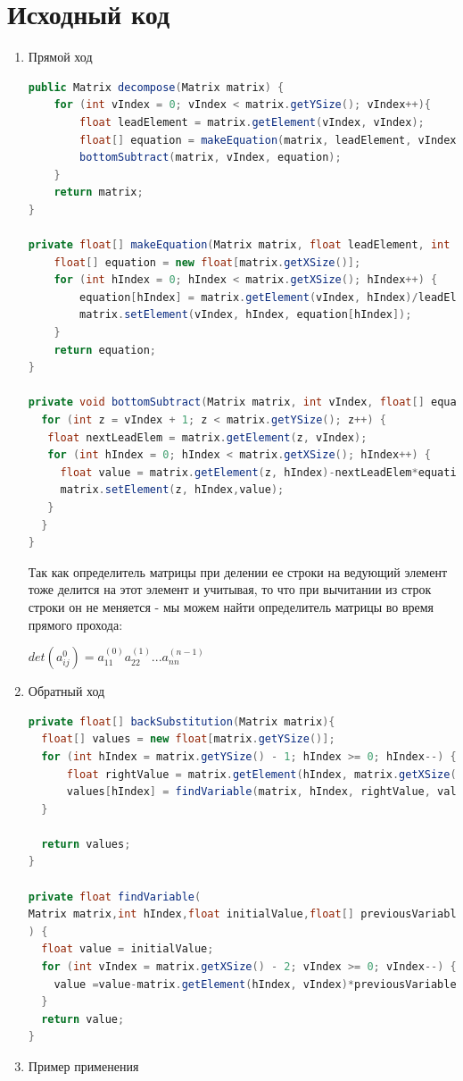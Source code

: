 \documentclass[12pt,letterpaper]{article}
\begin{document}
\section*{Исходный код}
\begin{enumerate}
\item Прямой ход
\begin{lstlisting}[language=java]
public Matrix decompose(Matrix matrix) {
    for (int vIndex = 0; vIndex < matrix.getYSize(); vIndex++){
        float leadElement = matrix.getElement(vIndex, vIndex);
        float[] equation = makeEquation(matrix, leadElement, vIndex);
        bottomSubtract(matrix, vIndex, equation);
    }
    return matrix;
}

private float[] makeEquation(Matrix matrix, float leadElement, int vIndex){
    float[] equation = new float[matrix.getXSize()];
    for (int hIndex = 0; hIndex < matrix.getXSize(); hIndex++) {
        equation[hIndex] = matrix.getElement(vIndex, hIndex)/leadElement;
        matrix.setElement(vIndex, hIndex, equation[hIndex]);
    }
    return equation;
}

private void bottomSubtract(Matrix matrix, int vIndex, float[] equation){
  for (int z = vIndex + 1; z < matrix.getYSize(); z++) {
   float nextLeadElem = matrix.getElement(z, vIndex);
   for (int hIndex = 0; hIndex < matrix.getXSize(); hIndex++) {
     float value = matrix.getElement(z, hIndex)-nextLeadElem*equation[hIndex];
     matrix.setElement(z, hIndex,value);
   }
  }
}
\end{lstlisting}
Так как определитель матрицы при делении ее строки на ведующий элемент тоже делится на этот элемент и учитывая, то что
при вычитании из строк строки он не меняется - мы можем найти определитель матрицы во время прямого прохода:
\begin{center}
    $det(a_{ij}^{0}) = a_{11}^{(0)}a_{22}^{(1)} ... a_{nn}^{(n-1)}$
\end{center}
\newpage
\item Обратный ход
\begin{lstlisting}[language=java]
private float[] backSubstitution(Matrix matrix){
  float[] values = new float[matrix.getYSize()];
  for (int hIndex = matrix.getYSize() - 1; hIndex >= 0; hIndex--) {
      float rightValue = matrix.getElement(hIndex, matrix.getXSize() - 1);
      values[hIndex] = findVariable(matrix, hIndex, rightValue, values);
  }

  return values;
}

private float findVariable(
Matrix matrix,int hIndex,float initialValue,float[] previousVariables
) {
  float value = initialValue;
  for (int vIndex = matrix.getXSize() - 2; vIndex >= 0; vIndex--) {
    value =value-matrix.getElement(hIndex, vIndex)*previousVariables[vIndex];
  }
  return value;
}
\end{lstlisting}
\item Пример применения 


\end{enumerate}
\end{document}
